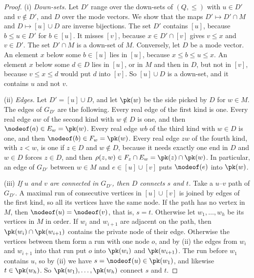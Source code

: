 \begin{proof}
(i) \emph{Down-sets.}
Let $D'$ range over the down-sets of $(Q, \leq)$ with $u \in D'$ and $v \notin D'$, and $D$ over the mode vectors.
We show that the maps $D' \mapsto D' \cap M$ and $D \mapsto [u] \cup D$ are inverse bijections.
The set $D'$ contains $[u]$, because $b \leq u \in D'$ for $b \in [u]$.
It misses $[v]$, because $x \in D' \cap [v]$ gives $v \leq x$ and $v \in D'$.
The set $D' \cap M$ is a down-set of $M$.
Conversely, let $D$ be a mode vector.
An element $x$ below some $b \in [u]$ lies in $[u]$, because $x \leq b \leq u \leq x$.
An element $x$ below some $d \in D$ lies in $[u]$, or in $M$ and then in $D$, but not in $[v]$, because $v \leq x \leq d$ would put $d$ into $[v]$.
So $[u] \cup D$ is a down-set, and it contains $u$ and not $v$.

(ii) \emph{Edges.}
Let $D' = [u] \cup D$, and let $\pk(w)$ be the side picked by $D$ for $w \in M$.
The edges of $G_{D'}$ are the following.
Every real edge of the first kind is one.
Every real edge $aw$ of the second kind with $w \notin D$ is one, and then $\nodeof(a) \in E_w = \pk(w)$.
Every real edge $wb$ of the third kind with $w \in D$ is one, and then $\nodeof(b) \in F_w = \pk(w)$.
Every real edge $zw$ of the fourth kind, with $z < w$, is one if $z \in D$ and $w \notin D$, because it needs exactly one end in $D$ and $w \in D$ forces $z \in D$, and then $\rho(z, w) \in F_z \cap E_w = \pk(z) \cap \pk(w)$.
In particular, an edge of $G_{D'}$ between $w \in M$ and $e \in [u] \cup [v]$ puts $\nodeof(e)$ into $\pk(w)$.

(iii) \emph{If $u$ and $v$ are connected in $G_{D'}$, then $D$ connects $s$ and $t$.}
Take a $u$--$v$ path of $G_{D'}$.
A maximal run of consecutive vertices in $[u] \cup [v]$ is joined by edges of the first kind, so all its vertices have the same node.
If the path has no vertex in $M$, then $\nodeof(u) = \nodeof(v)$, that is, $s = t$.
Otherwise let $w_1, \dots, w_h$ be its vertices in $M$ in order.
If $w_i$ and $w_{i+1}$ are adjacent on the path, then $\pk(w_i) \cap \pk(w_{i+1})$ contains the private node of their edge.
Otherwise the vertices between them form a run with one node $o$, and by (ii) the edges from $w_i$ and $w_{i+1}$ into that run put $o$ into $\pk(w_i)$ and $\pk(w_{i+1})$.
The run before $w_1$ contains $u$, so by (ii) we have $s = \nodeof(u) \in \pk(w_1)$, and likewise $t \in \pk(w_h)$.
So $\pk(w_1), \dots, \pk(w_h)$ connect $s$ and $t$.


\end{proof}
